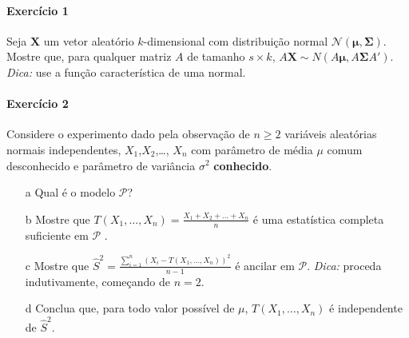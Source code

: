 \documentclass[10pt,a4paper]{article}
\title{}
\author{\normalsize Exercícios sobre Redução de Dados}
\date{}
\begin{document}
	\maketitle
	
 \paragraph{Exercício 1} Seja $\boldsymbol{X}$ um vetor aleatório $k$-dimensional com distribuição normal $\mathcal{N}(\boldsymbol{\mu},\boldsymbol{\Sigma})$. Mostre que, para qualquer matriz $A$ de tamanho $s \times k$, $A\boldsymbol{X} \sim N(A\boldsymbol{\mu},A\boldsymbol{\Sigma}A')$. \textit{Dica:} use a função característica de uma normal.
 \paragraph{Exercício 2} Considere o experimento dado pela observação de $n\geq 2$ variáveis aleatórias normais independentes, $X_1$,$X_2$,\ldots, $X_n$ com parâmetro de média $\mu$ comum desconhecido e parâmetro de variância $\sigma^2$ \textbf{conhecido}.
 
 \begin{enumerate}
 	\item[a] Qual é o modelo $\mathcal{P}$?
 	\item[b] Mostre que $T(X_1,\ldots, X_n) = \frac{X_1+X_2+\ldots+X_n}{n}$ é uma estatística completa suficiente em  $\mathcal{P}$ .
 	\item[c] Mostre que $\hat{S}^2 = \frac{\sum_{i=1}^n (X_i- T(X_1,\ldots, X_n))^2}{n-1}$ é ancilar em  $\mathcal{P}$. \textit{Dica:} proceda indutivamente, começando de $n=2$.
 	\item[d] Conclua que, para todo valor possível de $\mu$, $T(X_1,\ldots, X_n)$ é independente de $\hat{S}^2$.
 \end{enumerate}
\end{document}

